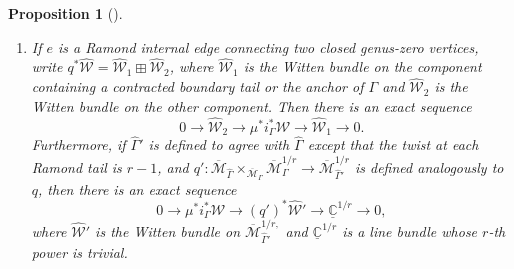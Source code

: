 \documentclass[11pt]{amsart}
\newtheorem{pr}[dummy]{Proposition}
\theoremstyle{definition}
\theoremstyle{remark}
\newcommand{\<}{\left<}
\renewcommand{\>}{\right>}
\numberwithin{equation}{section}
\def\Mbar{{\overline{\mathcal M}}}
\begin{document}
\begin{pr}[{\cite[Proposition 2.20]{TZ1}}]
\begin{enumerate}
\item If %
$e$ is a Ramond internal edge connecting two closed genus-zero vertices, write $q^*\widehat{\mathcal{W}} = \widehat{\mathcal{W}}_1 \boxplus \widehat{\mathcal{W}}_2$, where $\widehat{\mathcal{W}}_1$ is the Witten bundle on the component containing a contracted boundary tail or the anchor %
of $\Gamma$ and %
$\widehat{\mathcal{W}}_2$ is the Witten bundle on the other component.  Then there is an exact sequence
\begin{equation}
\label{eq decompose2}
0 \to \widehat{\mathcal{W}}_2 \to \mu^*i_{\Gamma}^*{\mathcal{W}} \to \widehat{\mathcal{W}}_1 \to 0.
\end{equation}
Furthermore, if $\widehat\Gamma'$ is defined to agree with $\widehat\Gamma$ except that the twist at each Ramond tail is $r-1$, and $q': \Mbar_{\widehat{\Gamma}} \times_{\Mbar_{\Gamma}} \Mbar_{\Gamma}^{1/r} \to \Mbar_{\widehat\Gamma'}^{1/r}$ is defined analogously to $q$, then there is an exact sequence
\begin{equation}
\label{eq decompose3}
0 \to \mu^*i_{\Gamma}^*{\mathcal{W}} \to (q')^*\widehat{{\mathcal{W}}}' \to {\underline{\mathbb{C}}}^{1/r} \to 0,
\end{equation}
where $\widehat{{\mathcal{W}}}'$ is the Witten bundle %
on $\Mbar_{\widehat\Gamma'}^{1/r,}$ and %
${\underline{\mathbb{C}}}^{1/r}$ is a line bundle whose $r$-th power is %
trivial.


\end{enumerate}
\end{pr}
\end{document}
